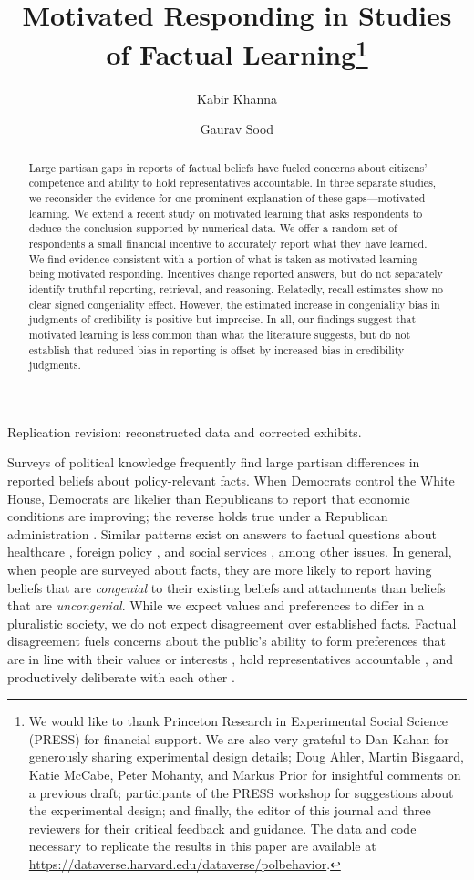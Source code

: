 \documentclass[12pt,letterpaper]{article}
\title{Motivated Responding in Studies of Factual Learning\thanks{We would like to thank Princeton Research in Experimental Social Science (PRESS) for financial support.
We are also very grateful to Dan Kahan for generously sharing experimental design details; Doug Ahler, Martin Bisgaard, Katie McCabe, Peter Mohanty, and Markus Prior for insightful comments on a previous draft; participants of the PRESS workshop for suggestions about the experimental design; and finally, the editor of this journal and three reviewers for their critical feedback and guidance.
The data and code necessary to replicate the results in this paper are available at \href{https://dataverse.harvard.edu/dataverse/polbehavior}{https://dataverse.harvard.edu/dataverse/polbehavior}.}}
\author{Kabir Khanna \and Gaurav Sood}
\date{}
\begin{document}
\maketitle
\begin{center}\small Replication revision: reconstructed data and corrected exhibits.\end{center}
\thispagestyle{empty}



\begin{abstract}
\noindent Large partisan gaps in reports of factual beliefs have fueled concerns about citizens' competence and ability to hold representatives accountable. In three separate studies, we reconsider the evidence for one prominent explanation of these gaps---motivated learning. We extend a recent study on motivated learning that asks respondents to deduce the conclusion supported by numerical data. We offer a random set of respondents a small financial incentive to accurately report what they have learned. We find evidence consistent with a portion of what is taken as motivated learning being motivated responding. Incentives change reported answers, but do not separately identify truthful reporting, retrieval, and reasoning. Relatedly, recall estimates show no clear signed congeniality effect. However, the estimated increase in congeniality bias in judgments of credibility is positive but imprecise. In all, our findings suggest that motivated learning is less common than what the literature suggests, but do not establish that reduced bias in reporting is offset by increased bias in credibility judgments.
\end{abstract}

\newpage
\doublespacing
{}

Surveys of political knowledge frequently find large partisan differences in reported beliefs about policy-relevant facts. When Democrats control the White House, Democrats are likelier than Republicans to report that economic conditions are improving; the reverse holds true under a Republican administration \citep{bartels2002}. Similar patterns exist on answers to factual questions about healthcare \citep[e.g.,][]{nyhan2010}, foreign policy \citep[e.g.,][]{jacobson2010}, and social services \citep[e.g.,][]{jerit2012}, among other issues. In general, when people are surveyed about facts, they are more likely to report having beliefs that are {\it congenial} to their existing beliefs and attachments than beliefs that are {\it uncongenial}. While we expect values and preferences to differ in a pluralistic society, we do not expect disagreement over established facts. Factual disagreement fuels concerns about the public's ability to form preferences that are in line with their values or interests \citep[e.g.,][]{hochschild2001}, hold representatives accountable \citep[e.g.,][]{bartels2002}, and productively deliberate with each other \citep[][]{shapiro2008, muirhead2013}.
\end{document}
